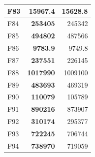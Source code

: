 \begin{table}[]
\begin{tabular}{l|r|r|}
\multicolumn{1}{|l|}{\cellcolor[HTML]{FCE6AB}F83}  & \cellcolor[HTML]{D3FFB6}\textbf{15967.4}                 & 15628.8                                                   \\ \hline
\multicolumn{1}{|l|}{\cellcolor[HTML]{FCE6AB}F84}  & \cellcolor[HTML]{D3FFB6}\textbf{253405}                  & 245342                                                    \\ \hline
\multicolumn{1}{|l|}{\cellcolor[HTML]{FCE6AB}F85}  & \cellcolor[HTML]{D3FFB6}\textbf{494802}                  & 487566                                                    \\ \hline
\multicolumn{1}{|l|}{\cellcolor[HTML]{FCE6AB}F86}  & \cellcolor[HTML]{D3FFB6}\textbf{9783.9}                  & 9749.8                                                    \\ \hline
\multicolumn{1}{|l|}{\cellcolor[HTML]{FCE6AB}F87}  & \cellcolor[HTML]{D3FFB6}\textbf{237551}                  & 226145                                                    \\ \hline
\multicolumn{1}{|l|}{\cellcolor[HTML]{FCE6AB}F88}  & \cellcolor[HTML]{D3FFB6}\textbf{1017990}                 & 1009100                                                   \\ \hline
\multicolumn{1}{|l|}{\cellcolor[HTML]{FCE6AB}F89}  & \cellcolor[HTML]{D3FFB6}\textbf{483693}                  & 469319                                                    \\ \hline
\multicolumn{1}{|l|}{\cellcolor[HTML]{FCE6AB}F90}  & \cellcolor[HTML]{D3FFB6}\textbf{110079}                  & 105789                                                    \\ \hline
\multicolumn{1}{|l|}{\cellcolor[HTML]{FCE6AB}F91}  & \cellcolor[HTML]{D3FFB6}\textbf{890216}                  & 873907                                                    \\ \hline
\multicolumn{1}{|l|}{\cellcolor[HTML]{FCE6AB}F92}  & \cellcolor[HTML]{D3FFB6}\textbf{310174}                  & 295377                                                    \\ \hline
\multicolumn{1}{|l|}{\cellcolor[HTML]{FCE6AB}F93}  & \cellcolor[HTML]{D3FFB6}\textbf{722245}                  & 706744                                                    \\ \hline
\multicolumn{1}{|l|}{\cellcolor[HTML]{FCE6AB}F94}  & \cellcolor[HTML]{D3FFB6}\textbf{738970}                  & 719059                                                    \\ \hline

\end{tabular}
\end{table}
